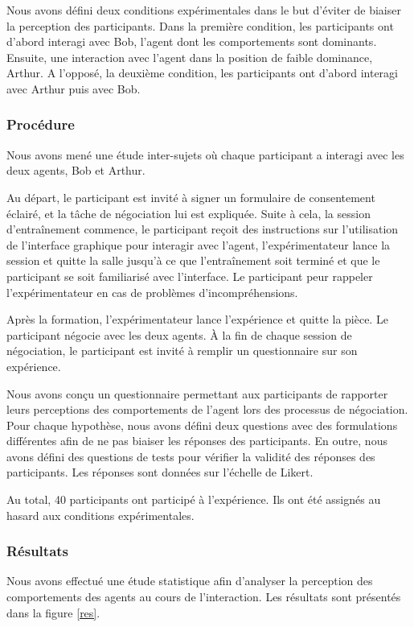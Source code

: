 {				Nous avons défini deux conditions expérimentales dans le but d'éviter de biaiser la perception des participants. Dans la première condition, les participants ont d'abord interagi avec Bob, l'agent dont les comportements sont dominants. Ensuite, une interaction avec l'agent dans la position de faible dominance, Arthur.
				A l'opposé, la deuxième condition, les participants ont d'abord interagi  avec Arthur puis avec Bob.
								
			
			\subsubsection{Procédure}
			
			Nous avons mené une étude inter-sujets où chaque participant a interagi avec les deux agents, Bob et Arthur.
			
			Au départ, le participant est invité à signer un formulaire de consentement éclairé, et  la tâche de négociation lui est expliquée. 
			Suite à cela, la  session d'entraînement commence, le participant reçoit des instructions sur l'utilisation de l'interface graphique pour interagir avec l'agent, l'expérimentateur lance la session et quitte la salle jusqu'à ce que l'entraînement soit terminé et que le participant se soit familiarisé avec l'interface. Le participant peur rappeler l'expérimentateur en cas de problèmes d'incompréhensions. 
			
			Après la formation, l'expérimentateur lance l'expérience et quitte la pièce. 
			Le participant négocie avec les deux agents. À la fin de chaque session de négociation, le participant est invité à remplir un questionnaire sur son expérience.
			
			Nous avons conçu un questionnaire permettant aux participants de rapporter leurs perceptions des comportements de l'agent lors des processus de négociation. Pour chaque hypothèse, nous avons défini deux questions avec des formulations différentes afin de ne pas biaiser les réponses des participants. En outre, nous avons défini des questions de tests pour vérifier la validité des réponses des participants. Les réponses sont données sur l'échelle de Likert.
			
			Au total, 40 participants ont participé à l'expérience. Ils ont été assignés au hasard aux conditions expérimentales.
			
			\subsubsection{Résultats}
			Nous avons effectué une étude statistique afin d'analyser la perception des comportements des agents au cours de l'interaction. Les résultats sont présentés dans la figure \ref{res}.
			
}
